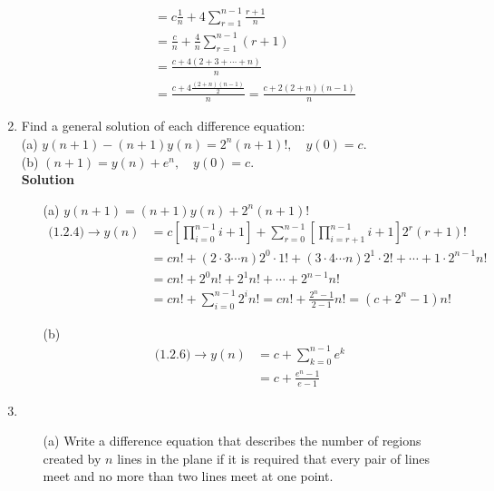 \begin{enumerate}
\begin{itemize}
\begin{align*}
                                           & =c\frac{1}{n}+4\sum_{r=1}^{n-1}\frac{r+1}{n} \\
                                           & =\frac{c}{n}+\frac{4}{n}\sum_{r=1}^{n-1}(r+1) \\
                                           & =\frac{c+4(2+3+\cdots+n)}{n} \\
                                           & =\frac{c+4\frac{(2+n)(n-1)}{2}}{n}=\frac{c+2(2+n)(n-1)}{n}
                \end{align*}
        \end{itemize}
    \item Find a general solution of each difference equation: \\
        (a) $y(n+1)-(n+1)y(n)=2^n (n+1)!,\quad y(0)=c.$ \\
        (b) $(n+1)=y(n)+e^n,\quad y(0)=c.$ \\
        \textbf{Solution}
        \begin{itemize}
            \item[(a)] $y(n+1)=(n+1)y(n)+2^n(n+1)!$
                \begin{align*}
                \text{(1.2.4)}\to y(n) & =c\left[\prod_{i=0}^{n-1}i+1\right]+\sum_{r=0}^{n-1}\left[\prod_{i=r+1}^{n-1}i+1\right]2^r (r+1)! \\
                                       & =cn!+(2\cdot 3\cdots n)2^0\cdot 1!+(3\cdot 4\cdots n)2^1\cdot 2!+\cdots+1\cdot 2^{n-1} n! \\
                                       & =cn!+2^0 n!+2^1 n!+\cdots+2^{n-1}n! \\
                                       & =cn!+\sum_{i=0}^{n-1}2^i n!=cn!+\frac{2^n -1}{2-1}n!=(c+2^n-1)n!
                \end{align*}
            \item[(b)] \begin{align*}
                    \text{(1.2.6)}\to y(n) & =c+\sum_{k=0}^{n-1}e^k \\
                                           & =c+\frac{e^n -1}{e-1}
                \end{align*}
        \end{itemize}
    \item \begin{itemize}
            \item[(a)] Write a difference equation that describes the number of regions created by $n$ lines in the plane if it is required that every pair of lines meet and no more than two lines meet at one point.

\end{itemize}
\end{enumerate}
